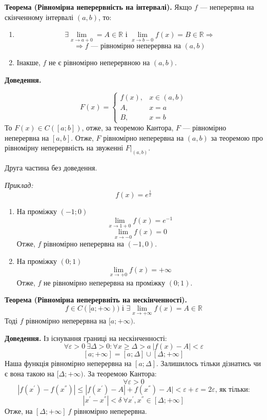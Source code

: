 \documentclass[12pt]{report}
\begin{document}
\textbf{Теорема (Рівномірна неперервність на інтервалі).} Якщо $f$ --- неперервна на скінченному інтервалі $(a,b)$, то:

\begin{enumerate}
	\item $$ \exists \lim\limits_{x \to a + 0} = A \in \mathbb{R} \textrm{ і } \lim\limits_{x \to b - 0} f(x) = B \in \mathbb{R} \Longrightarrow$$
		$$ \Longrightarrow f \textrm{ --- рівномірно неперервна на $(a,b)$}$$
	\item Інакше, $f$ не є рівномірно неперервною на $(a,b)$. 
\end{enumerate}

\textbf{Доведення.} 

$$F(x) = \begin{cases}
	f(x), & x \in (a,b) \\
	A, & x = a \\
	B, & x = b
\end{cases}$$
То $F(x) \in C ([a;b])$, отже, за теоремою Кантора, $F$ --- рівномірно неперервна на $[a,b]$. Отже, $F$ рівномірно неперервна на $(a,b)$ за теоремою про рівномірну неперервність на звуженні $F | _{(a,b)}$.

Друга частина без доведення.

\vspace{3mm}

\textit{Приклад:}
$$f(x) = e^{ \frac{1}{x}}$$

\begin{enumerate}
	\item На проміжку $ (-1; 0)$
		$$ \lim\limits_{x \to 1+0}f(x) = e^{-1} $$
		$$ \lim\limits_{x\to -0} f(x) = 0 $$
		Отже, $f$ рівномірно неперервна на $(-1, 0)$.
	\item На проміжку $(0;1)$
		$$ \lim\limits_{ x\to +0} f(x) = + \infty$$
		Отже, $f$ не рівномірно неперервна на проміжку $(0;1)$.	
\end{enumerate}

\vspace{3mm}

\textbf{Теорема (Рівномірна неперервніть на нескінченності).}
$$f \in C( [a; +\infty)) \textrm{ і } \exists \lim\limits_{x \to +\infty} f(x) = A \in \mathbb{R}$$
Тоді $f$ рівномірно неперервна на $[a; +\infty)$.

\textbf{Доведення.} 
Із існування границі на нескінченності:
$$\forall \varepsilon > 0 \ \exists \Delta > 0 : \forall x \geq \Delta > a \ |f(x) - A| < \varepsilon$$
$$[a; +\infty] = [a; \Delta] \cup [\Delta; +\infty]$$
Наша функція рівномірно неперервна на $[a; \Delta]$. Залишилось тільки дізнатись чи є вона такою на $[\Delta; +\infty)$. За теоремою Кантора:
$$\forall \varepsilon > 0$$
$$|f(x^{'}) - f(x^{''})| \leq |f(x^{'}) - A| + f(x^{''}) - A| < \varepsilon + \varepsilon = 2 \varepsilon \textrm{, як тільки:}$$
$$|x^{'} - x^{''}| < \delta \ \forall x^{'}, x^{''} \in [\Delta; +\infty]$$
Отже, на $[\Delta; +\infty] \ f$ рівномірно неперервна.
\end{document}
